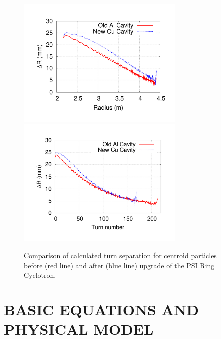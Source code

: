 \documentclass[aps,prstab,twocolumn,superscriptaddress]{revtex4}
\begin{document}
    
  \begin{figure}
    {\includegraphics[width=8cm,trim=2.5cm 2.5cm 2.5cm 2.5cm]{figures/R_dR_Ring.pdf}}
    {\includegraphics[width=8cm,trim=2.5cm 2.5cm 2.5cm 2.5cm]{figures/Turn_dR_Ring.pdf}}
    \caption{Comparison of calculated turn separation for centroid particles before (red line) and after (blue line) upgrade of the PSI Ring Cyclotron.}
    \label{fig:TuneSep}
  \end{figure}

\section{BASIC EQUATIONS AND PHYSICAL MODEL }
\end{document}
